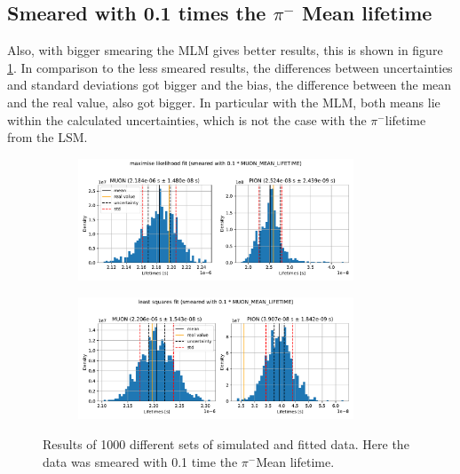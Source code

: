 \documentclass[11pt, a4paper, oneside]{book}
\newcommand\DoublePlotwidth{0.9}
\newcommand{\pion}{$\pi^{-}$}
\begin{document}
\FloatBarrier
\subsection{Smeared with 0.1 times the \texorpdfstring{\pion}{pion} Mean lifetime}

Also, with bigger smearing the MLM gives better results, this is shown in figure \ref{fig:results_smeared_1}. In comparison to the less smeared results, the differences between uncertainties and standard deviations got bigger and the bias, the difference between the mean and the real value, also got bigger. In particular with the MLM, both means lie within the calculated uncertainties, which is not the case with the \pion lifetime from the LSM.

\begin{figure}[h]
\begin{subfigure}{\textwidth}
  \centering
  \includegraphics[width=\DoublePlotwidth\textwidth]{images/4b_hist_1_likelihood.pdf}
\end{subfigure}

\begin{subfigure}{\textwidth}
  \centering
  \includegraphics[width=\DoublePlotwidth\textwidth]{images/4b_hist_1_squares.pdf}
\end{subfigure}
\caption{Results of 1000 different sets of simulated and fitted data. Here the data was smeared with 0.1 time the \pion Mean lifetime.}
\label{fig:results_smeared_1}
\end{figure}
\end{document}
